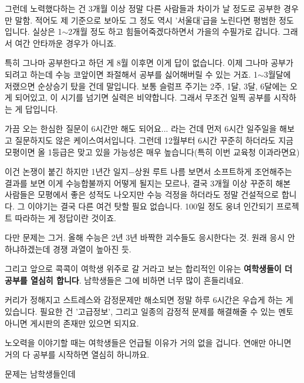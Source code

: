 그런데 노력했다하는 건 3개월 이상 정말 다른 사람들과 차이가 날 정도로 공부한 경우만 말함.
적어도 제 기준으로 보아도 그 정도 역시 '서울대'급을 노린다면 평범한 정도입니다.
실상은 1$\sim$2개월 정도 하고 힘들어죽겠다하면서 가을의 수필가로 갑니다. 그래서 여간 안타까운 경우가 아니죠.
\vspace{5mm}

특히 그나마 공부한다고 하던 게 8월 이후면 이게 답이 없습니다. 이제 그나마 공부가 되려고 하는데 수능 코앞이면 좌절해서
공부를 싫어해버릴 수 있는 거죠. 1$\sim$3월달에 저랬으면 순상승기 탔을 건데 말입니다.
보통 슬럼프 주기는 2주, 1달, 3달, 6달에는 오게 되어있고, 이 시기를 넘기면 실력은 비약합니다.
그래서 무조건 일찍 공부를 시작하는 게 답입니다.
\vspace{5mm}

가끔 오는 한심한 질문이 6시간만 해도 되어요... 라는 건데 먼저 6시간 일주일을 해보고 질문하지도 않은 케이스여서입니다.
그런데 12월부터 6시간 꾸준히 하더라도 지금 모평이면 올 1등급은 맞고 있을 가능성은 매우 높습니다(특히 이번 교육청 이과라면요)
\vspace{5mm}

이건 논쟁이 붙긴 하지만 1년간 일지$-$상원 루트 나름 보면서 소프트하게 조언해주는 결과를 보면
이게 수능합불까지 어떻게 될지는 모르나, 결국 3개월 이상 꾸준히 해본 사람들은 모평에서 좋은 성적도 나오지만
수능 걱정을 하더라도 정말 건설적으로 합니다.
그 이야기는 결국 다른 여건 탓할 필요 없습니다. 100일 정도 웅녀 인간되기 프로젝트 따라하는 게 정답이란 것이죠.
\vspace{5mm}

다만 문제는 그거. 올해 수능은 2년 3년 바짝한 괴수들도 응시한다는 것. 원래 응시 안 하냐하겠는데 경쟁 과열이 높아진 듯.
\vspace{5mm}

그리고 앞으로 콕콕이 여학생 위주로 갈 거라고 보는 합리적인 이유는
\textbf{여학생들이 더 공부를 열심히 합니다}. 남학생들은 그에 비하면 너무 많이 흔들리네요.
\vspace{5mm}

커리가 정해지고 스트레스와 감정문제만 해소되면 정말 하루 6시간은 우습게 하는 게 있습니다.
필요한 건 '고급정보', 그리고 일종의 감정적 문제를 해결해줄 수 있는 멘토 아니면 게시판의 존재만 있으면 되지요.
\vspace{5mm}

노오력을 이야기할 때는 여학생들은 언급될 이유가 거의 없을 겁니다. 연애만 아니면 거의 다 공부를 시작하면 열심히 하니까요.
\vspace{5mm}

문제는 남학생들인데
\vspace{5mm}

